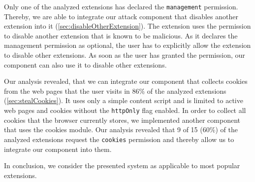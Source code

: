 	Only one of the analyzed extensions has declared the \texttt{management} permission. Thereby, we are able to integrate our attack component that disables another extension into it (\autoref{sec:disableOtherExtension}). The extension uses the permission to disable another extension that is known to be malicious. As it declares the management permission as optional, the user has to explicitly allow the extension to disable other extensions. As soon as the user has granted the permission, our component can also use it to disable other extensions. %

	Our analysis revealed, that we can integrate our component that collects cookies from the web pages that the user visits in 86\% of the analyzed extensions (\autoref{sec:stealCookies}). It uses only a simple content script and is limited to active web pages and cookies without the \texttt{httpOnly} flag enabled. In order to collect all cookies that the browser currently stores, we implemented another component that uses the cookies module. Our analysis revealed that 9 of 15 (60\%) of the analyzed extensions request the \texttt{cookies} permission and thereby allow us to integrate our component into them. 
	
	In conclusion, we consider the presented system as applicable to most popular extensions.
	
